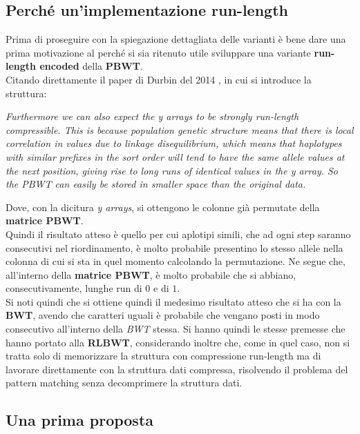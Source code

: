 \subsection{Perché un'implementazione run-length}
Prima di proseguire con la spiegazione dettagliata delle varianti è bene dare
una prima motivazione al perché si sia ritenuto utile sviluppare una variante
\textbf{run-length encoded} della \textbf{PBWT}.\\
Citando direttamente il paper di Durbin del 2014 \cite{pbwt}, in cui si
introduce la struttura:
\begin{center}
  \textit{Furthermore we can also expect the y arrays to be strongly run-length
    compressible. This is because population genetic structure means that there
    is local correlation in values due to linkage disequilibrium, which means
    that haplotypes with similar prefixes in the sort order will tend to have
    the same allele values at the next position, giving rise to long runs of
    identical values in the y array. So the PBWT can easily be stored in smaller
    space than the original data.} 
\end{center}
Dove, con la dicitura \textit{y arrays}, si ottengono le colonne già permutate
della \textbf{matrice PBWT}.\\
Quindi il risultato atteso è quello per cui aplotipi simili, che ad ogni step
saranno consecutivi nel riordinamento, è molto probabile presentino lo stesso
allele nella colonna di cui si sta in quel momento calcolando la
permutazione. Ne segue che, all'interno della \textbf{matrice PBWT}, è molto
probabile che si abbiano, consecutivamente, lunghe run di $0$ e di $1$.\\
Si noti quindi che si ottiene quindi il medesimo risultato atteso che si ha con
la \textbf{BWT}, avendo che caratteri uguali è probabile che vengano posti in
modo consecutivo all'interno della \textit{BWT} stessa. Si hanno quindi le
stesse premesse che hanno portato alla \textbf{RLBWT}, considerando inoltre che,
come in quel caso, non si tratta solo di memorizzare la struttura con
compressione run-length ma di lavorare direttamente con la struttura dati
compressa, risolvendo il problema del pattern matching senza decomprimere la
struttura dati.
\subsection{Una prima proposta}
